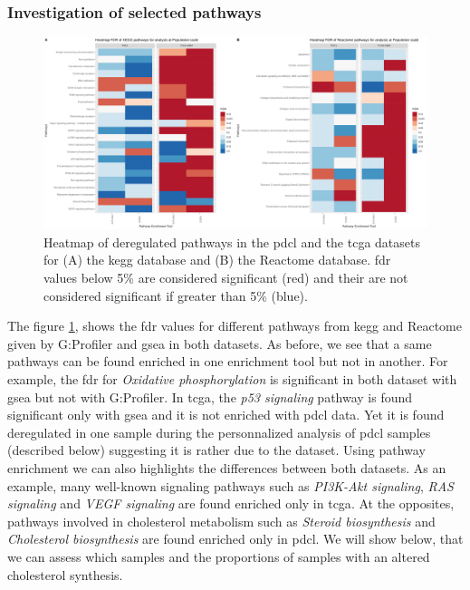 \subsubsection{Investigation of selected pathways}

\begin{figure}
    \includegraphics[width=\textwidth]{img/heatmap-fdr-global}
    \caption{
        Heatmap of deregulated pathways in the \acrshort{pdcl} and the \acrshort{tcga} datasets for (A) the \acrshort{kegg} database and (B) the Reactome database.
        \acrshort{fdr} values below 5\% are considered significant (red) and their are not considered significant if greater than 5\% (blue).
    }
    \label{fig:heatmap-fdr-global}
\end{figure}

The figure \ref*{fig:heatmap-fdr-global}, shows the \acrshort{fdr} values for different pathways from \acrshort{kegg} and Reactome given by G:Profiler and \acrshort{gsea} in both datasets.
As before, we see that a same pathways can be found enriched in one enrichment tool but not in another.
For example, the \acrshort{fdr} for \textit{Oxidative phosphorylation} is significant in both dataset with \acrshort{gsea} but not with G:Profiler.
In \acrshort{tcga}, the \textit{p53 signaling} pathway is found significant only with \acrshort{gsea} and it is not enriched with \acrshort{pdcl} data.
Yet it is found deregulated in one sample during the personnalized analysis of \acrshort{pdcl} samples (described below) suggesting it is rather due to the dataset.
Using pathway enrichment we can also highlights the differences between both datasets.
As an example, many well-known signaling pathways such as \textit{PI3K-Akt signaling}, \textit{RAS signaling} and \textit{VEGF signaling} are found enriched only in \acrshort{tcga}.
At the opposites, pathways involved in cholesterol metabolism such as \textit{Steroid biosynthesis} and \textit{Cholesterol biosynthesis} are found enriched only in \acrshort{pdcl}.
We will show below, that we can assess which samples and the proportions of samples with an altered cholesterol synthesis.

